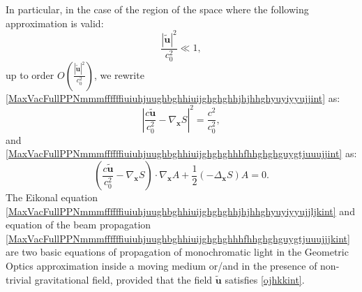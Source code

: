 \documentclass{article}
\theoremstyle{definition}
\theoremstyle{remark}
\renewcommand{\vec}[1]{\mathbf{#1}}
\newcommand{\er}{\eqref}
\newcommand{\er}{\eqref}
\begin{document}
In particular, in the case of the region of the space where the
following approximation is valid:
\begin{equation}\label{ojhkkint}
\frac{|\vec {\tilde u}|^2}{c^2_0}\ll 1,
\end{equation}
up to order $O\left(\frac{|\vec {\tilde u}|^2}{c^2_0}\right)$, we
rewrite
\er{MaxVacFullPPNmmmffffffiuiuhjuughbghhiuijghghghhjhjhhghyuyiyyujjint}
as:
\begin{equation}\label{MaxVacFullPPNmmmffffffiuiuhjuughbghhiuijghghghhjhjhhghyuyiyyujjljkint}
\left|\frac{c\vec {\tilde u}}{c^2_0}-\nabla_\vec x
S\right|^2=\frac{c^2}{c^2_0},
\end{equation}
and
\er{MaxVacFullPPNmmmffffffiuiuhjuughbghhiuijghghghhhfhhghghguygtjuuujjint}
as:
\begin{equation}\label{MaxVacFullPPNmmmffffffiuiuhjuughbghhiuijghghghhhfhhghghguygtjuuujjjkint}
\left(\frac{c\vec {\tilde u}}{c^2_0}-\nabla_{\vec
x}S\right)\cdot\nabla_{\vec x}A+\frac{1}{2}\left(-\Delta_{\vec
x}S\right)A=0.
\end{equation}
The Eikonal equation
\er{MaxVacFullPPNmmmffffffiuiuhjuughbghhiuijghghghhjhjhhghyuyiyyujjljkint}
and equation of the beam propagation
\er{MaxVacFullPPNmmmffffffiuiuhjuughbghhiuijghghghhhfhhghghguygtjuuujjjkint}
are two basic equations of propagation of monochromatic light in the
Geometric Optics approximation inside a moving medium or/and in the
presence of non-trivial gravitational field, provided that the field
$\vec {\tilde u}$ satisfies \er{ojhkkint}.
\end{document}
